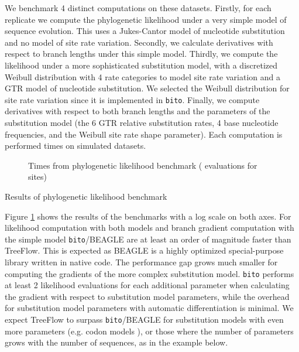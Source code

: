 We benchmark 4 distinct computations on these datasets. Firstly, for each replicate we compute the phylogenetic likelihood under a very simple model of sequence evolution. This uses a Jukes-Cantor model of nucleotide substitution and no model of site rate variation. Secondly, we calculate derivatives with respect to branch lengths under this simple model. Thirdly, we compute the likelihood under a more sophisticated substitution model, with a discretized Weibull distribution with 4 rate categories to model site rate variation and a GTR model of nucleotide substitution. We selected the Weibull distribution for site rate variation since it is implemented in \texttt{bito}. Finally, we compute derivatives with respect to both branch lengths and the parameters of the substitution model (the 6 GTR relative substitution rates, 4 base nucleotide frequencies, and the Weibull site rate shape parameter). Each computation is performed  times on  simulated datasets.


\begin{figure}
    \centering
    \caption{Times from phylogenetic likelihood benchmark ( evaluations for  sites)}
    \label{fig:benchmark}
\end{figure}

\begin{table}
    \centering
    \caption{Results of phylogenetic likelihood benchmark}
    \label{tab:benchmarkfit}
\end{table}

Figure \ref{fig:benchmark} shows the results of the benchmarks with a log scale on both axes. For likelihood computation with both models and branch gradient computation with the simple model \texttt{bito}/BEAGLE are at least an order of magnitude faster than TreeFlow. This is expected as BEAGLE is a highly optimized special-purpose library written in native code. The performance gap grows much smaller for computing the gradients of the more complex substitution model. \texttt{bito} performs at least 2 likelihood evaluations for each additional parameter when calculating the gradient with respect to substitution model parameters, while the overhead for substitution model parameters with automatic differentiation is minimal. We expect TreeFlow to surpass \texttt{bito}/BEAGLE for substitution models with even more parameters (e.g. codon models \cite{goldman1994codon}), or those where the number of parameters grows with the number of sequences, as in the example below.

